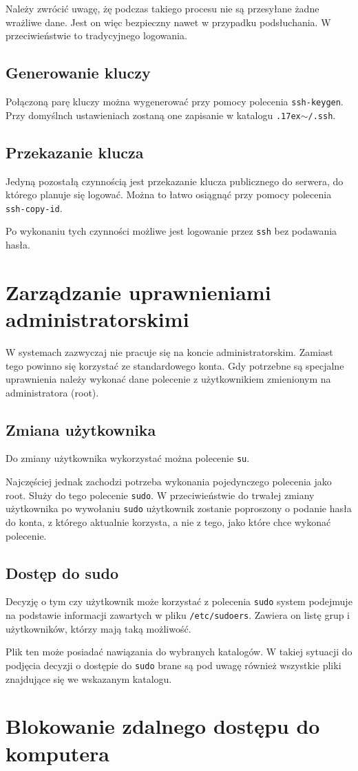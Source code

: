 \documentclass{article}
\begin{document}
Należy zwrócić uwagę, żę podczas takiego procesu nie są przesyłane żadne wrażliwe dane. Jest on więc bezpieczny nawet w przypadku podsłuchania. W przeciwieństwie to tradycyjnego logowania.

\subsection{Generowanie kluczy}
Połączoną parę kluczy można wygenerować przy pomocy polecenia \texttt{ssh-keygen}. Przy domyślnch ustawieniach zostaną one zapisanie w katalogu \texttt{{\raise.17ex\hbox{$\scriptstyle\sim$}}/.ssh}.

\subsection{Przekazanie klucza}
Jedyną pozostałą czynnością jest przekazanie klucza publicznego do serwera, do którego planuje się logować. Można to łatwo osiągnąć przy pomocy polecenia \texttt{ssh-copy-id}.

Po wykonaniu tych czynności możliwe jest logowanie przez \texttt{ssh} bez podawania hasła.

\section{Zarządzanie uprawnieniami administratorskimi}
W systemach zazwyczaj nie pracuje się na koncie administratorskim. Zamiast tego powinno się korzystać ze standardowego konta. Gdy potrzebne są specjalne uprawnienia należy wykonać dane polecenie z użytkownikiem zmienionym na administratora (root).

\subsection{Zmiana użytkownika}
Do zmiany użytkownika wykorzystać można polecenie \texttt{su}.

Najczęściej jednak zachodzi potrzeba wykonania pojedynczego polecenia jako root. Służy do tego polecenie \texttt{sudo}. W przeciwieństwie do trwałej zmiany użytkownika po wywołaniu \texttt{sudo} użytkownik zostanie poproszony o podanie hasła do konta, z którego aktualnie korzysta, a nie z tego, jako które chce wykonać polecenie.

\subsection{Dostęp do sudo}
Decyzję o tym czy użytkownik może korzystać z polecenia \texttt{sudo} system podejmuje na podstawie informacji zawartych w pliku \texttt{/etc/sudoers}. Zawiera on listę grup i użytkowników, którzy mają taką możliwość.

Plik ten może posiadać nawiązania do wybranych katalogów. W takiej sytuacji do podjęcia decyzji o dostępie do \texttt{sudo} brane są pod uwagę również wszystkie pliki znajdujące się we wskazanym katalogu.

\section{Blokowanie zdalnego dostępu do komputera}
\end{document}
